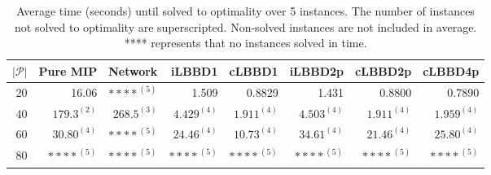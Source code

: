 \begin{table*}
    \centering
    \caption{Average time (seconds) until solved to optimality over 5 instances. The number of instances not solved to optimality are superscripted. Non-solved instances are not included in average. **** represents that no instances solved in time.}
    \begin{tabular}{rrrrrrrr} \toprule
        $|\mathcal{P}|$ & Pure MIP & Network & iLBBD1 & cLBBD1 & iLBBD2p & cLBBD2p & cLBBD4p \\ \midrule
        20              & 16.06 &     ${****}^{(5)}$    & 1.509 &  0.8829 & 1.431 & 0.8800 & 0.7890 \\
        40              & $179.3^{(2)}$ & $268.5^{(3)}$   &  $4.429^{(4)}$ & $1.911^{(4)}$ & $4.503^{(4)}$ & $1.911^{(4)}$ & $1.959^{(4)}$ \\
        60 & $30.80^{(4)}$ & ${****}^{(5)}$ & $24.46^{(4)}$ & $10.73^{(4)}$ & $34.61^{(4)}$ & $21.46^{(4)}$ & $25.80^{(4)}$ \\
        80 & ${****}^{(5)}$ & ${****}^{(5)}$ & ${****}^{(5)}$ & ${****}^{(5)}$ & ${****}^{(5)}$ & ${****}^{(5)}$ & ${****}^{(5)}$ \\
        \bottomrule
    \end{tabular}
\end{table*}
